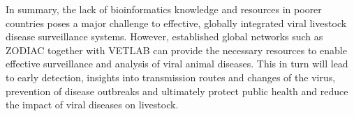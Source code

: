In summary, the lack of bioinformatics knowledge and resources in poorer countries poses a major challenge to effective, globally integrated viral livestock disease surveillance systems. However, established global networks such as \ac{ZODIAC} together with \ac{VETLAB} can provide the necessary resources to enable effective surveillance and analysis of viral animal diseases. This in turn will lead to early detection, insights into transmission routes and changes of the virus, prevention of disease outbreaks and ultimately protect public health and reduce the impact of viral diseases on livestock.
